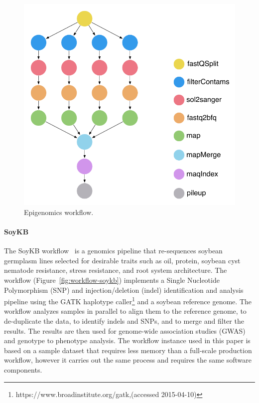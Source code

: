 \begin{figure}[!t]
	\centering
	\includegraphics[width=0.7\linewidth]{figures/workflow-genome}
	\caption{Epigenomics workflow.}
	\label{fig:workflow-genome}
\end{figure}

\paragraph{\textbf{SoyKB}}
The SoyKB workflow~\cite{soybean, Joshi01012014} is a genomics pipeline 
that re-sequences soybean germplasm lines selected for desirable traits such 
as oil, protein, soybean cyst nematode resistance, stress resistance, and root 
system architecture. The workflow (Figure~\ref{fig:workflow-soykb}) 
implements a Single Nucleotide Polymorphism (SNP)  and injection/deletion (indel) identification and analysis 
pipeline using the GATK haplotype caller\footnote{https://www.broadinstitute.org/gatk,(accessed 2015-04-10)} and a soybean reference 
genome. The workflow analyzes samples in parallel to align them to the reference 
genome, to de-duplicate the data, to identify indels and SNPs, and to merge and 
filter the results. The results are then used for genome-wide association studies 
(GWAS) and genotype to phenotype analysis. The workflow instance used in this 
paper is based on a sample dataset that requires less memory than a full-scale 
production workflow, however it carries out the same process and 
	requires the same software components.

